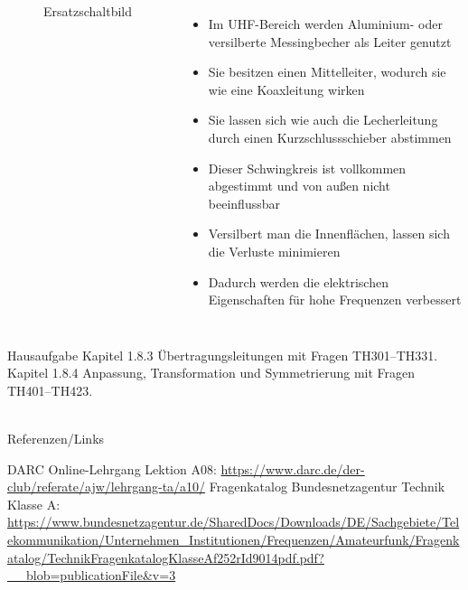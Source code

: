 \begin{frame}
\begin{columns}
\begin{figure}
      \caption{Ersatzschaltbild}
    \end{figure}
    \begin{itemize}
      \item Im UHF-Bereich werden Aluminium- oder versilberte Messingbecher als Leiter genutzt
      \item Sie besitzen einen Mittelleiter, wodurch sie wie eine Koaxleitung wirken
      \item Sie lassen sich wie auch die Lecherleitung durch einen Kurzschlussschieber abstimmen
      \item Dieser Schwingkreis ist vollkommen abgestimmt und von außen nicht beeinflussbar
      \item Versilbert man die Innenflächen, lassen sich die Verluste minimieren
      \item Dadurch werden die elektrischen Eigenschaften für hohe Frequenzen verbessert
    \end{itemize}
  \end{columns}
\end{frame}

\begin{frame}
  \begin{exampleblock}{Hausaufgabe}
    Kapitel 1.8.3 Übertragungsleitungen mit Fragen TH301--TH331.\\
    Kapitel 1.8.4 Anpassung, Transformation und Symmetrierung mit Fragen TH401--TH423.\\
  \end{exampleblock}
\end{frame}

\renewcommand{\refname}{Referenzen}

\hypertarget{refs}{}
\textcolor{white}{} \\ %
\Large Referenzen/Links
\footnotesize

\begin{thebibliography}{}
    DARC Online-Lehrgang Lektion A08:
    \url{https://www.darc.de/der-club/referate/ajw/lehrgang-ta/a10/}
     Fragenkatalog Bundesnetzagentur Technik Klasse A:
    \mbox{\url{https://www.bundesnetzagentur.de/SharedDocs/Downloads/DE/Sachgebiete/Telekommunikation/Unternehmen_Institutionen/Frequenzen/Amateurfunk/Fragenkatalog/TechnikFragenkatalogKlasseAf252rId9014pdf.pdf?__blob=publicationFile&v=3}}
\end{thebibliography}


